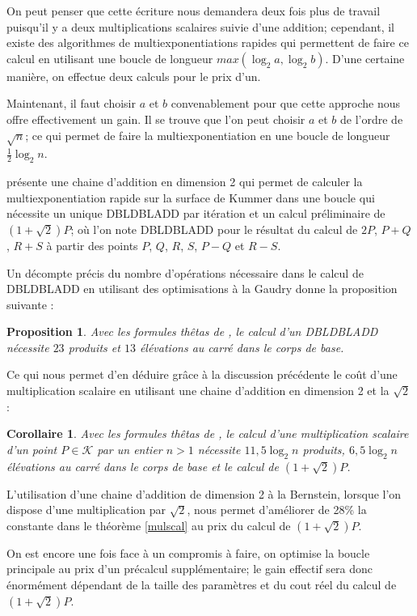 \documentclass[a4paper,12pt]{article}
\newtheorem{proposition}[theoreme]{Proposition}
\newtheorem{corollaire}[theoreme]{Corollaire}
\theoremstyle{definition}
\theoremstyle{remark}
\numberwithin{equation}{section}
\begin{document}
On peut penser que cette écriture nous demandera deux fois plus de travail puisqu'il y a deux multiplications scalaires suivie d'une addition; cependant, il existe des algorithmes de multiexponentiations rapides qui permettent de faire ce calcul en utilisant une boucle de longueur $max(\log_2 a, \log_2 b)$. D'une certaine manière, on effectue deux calculs pour le prix d'un.

Maintenant, il faut choisir $a$ et $b$ convenablement pour que cette approche nous offre effectivement un gain. Il se trouve que l'on peut choisir $a$ et $b$ de l'ordre de $\sqrt{n}$; ce qui permet de faire la multiexponentiation en une boucle de longueur $\frac{1}{2}\log_2 n$.

\citet{bernstein} présente une chaine d'addition en dimension 2 qui permet de calculer la multiexponentiation rapide sur la surface de Kummer dans une boucle qui nécessite un unique DBLDBLADD par itération et un calcul préliminaire de $(1+\sqrt{2})P$; où l'on note DBLDBLADD pour le résultat du calcul de $2P$, $P+Q$, $R+S$ à partir des points $P$, $Q$, $R$, $S$, $P-Q$ et $R-S$.

Un décompte précis du nombre d'opérations nécessaire dans le calcul de DBLDBLADD en utilisant des optimisations à la Gaudry donne la proposition suivante :
\begin{proposition}
Avec les formules thêtas de \citep{gaudry}, le calcul d'un DBLDBLADD nécessite $23$ produits et $13$ élévations au carré dans le corps de base.
\end{proposition}

Ce qui nous permet d'en déduire grâce à la discussion précédente le coût d'une multiplication scalaire en utilisant une chaine d'addition en dimension 2 et la $\sqrt{2}$ :
\begin{corollaire}
Avec les formules thêtas de \citep{gaudry}, le calcul d'une multiplication scalaire d'un point $P \in \mathcal{K}$ par un entier $n > 1$ nécessite $11,5\log_2 n$ produits, $6,5\log_2 n$ élévations au carré dans le corps de base et le calcul de $(1+\sqrt{2})P$.
\end{corollaire}

L'utilisation d'une chaine d'addition de dimension 2 à la Bernstein, lorsque l'on dispose d'une multiplication par $\sqrt{2}$, nous permet d'améliorer de 28\% la constante dans le théorème \ref{mulscal} au prix du calcul de $(1+\sqrt{2})P$.

On est encore une fois face à un compromis à faire, on optimise la boucle principale au prix d'un précalcul supplémentaire; le gain effectif sera donc énormément dépendant de la taille des paramètres et du cout réel du calcul de $(1+\sqrt{2})P$.
\end{document}
